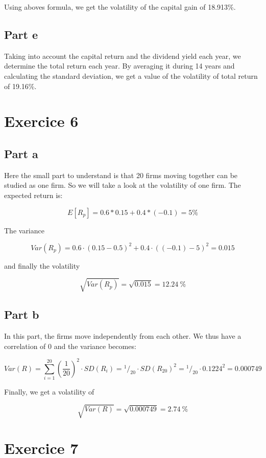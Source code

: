 \documentclass[a4paper,11pt,twoside]{article}
\def \be {\begin{equation}}
\def \ee {\end{equation}}
\begin{document}
Using aboves formula, we get the volatility of the capital gain of 18.913\%.

\subsection*{Part e}

Taking into account the capital return and the dividend yield each year, we determine the total return each year. By averaging it during 14 years and calculating the standard deviation, we get a value of the volatility of total return of 19.16\%.


\section*{Exercice 6}
\subsection*{Part a}

Here the small part to understand is that 20 firms moving together can be studied as one firm. So we will take a look at the volatility of one firm. The expected return is:

\be
E[R_p] = 0.6 * 0.15 + 0.4 *(-0.1) = 5\% 
\ee 

The variance

\be
Var(R_p) =0.6 \cdot (0.15 - 0.5)^2 + 0.4 \cdot ((-0.1) - 5)^2 = 0.015
\ee

and finally the volatility 

\be
\sqrt{Var(R_p)} = \sqrt{0.015} = 12.24\ \%
\ee

\subsection*{Part b}

In this part, the firms move independently from each other. We thus have a correlation of 0 and the variance becomes:

\be
Var(R) =  \sum_{i = 1}^{20} \left(\frac{1}{20}\right)^2 \cdot SD(R_i) = {}^1/_{20} \cdot SD(R_{20})^2 = {}^1/_{20} \cdot 0.1224^2 = 0.000749
\ee

Finally, we get a volatility of

\be
\sqrt{Var(R)} = \sqrt{0.000749} = 2.74\ \%
\ee
\section*{Exercice 7}
\end{document}
